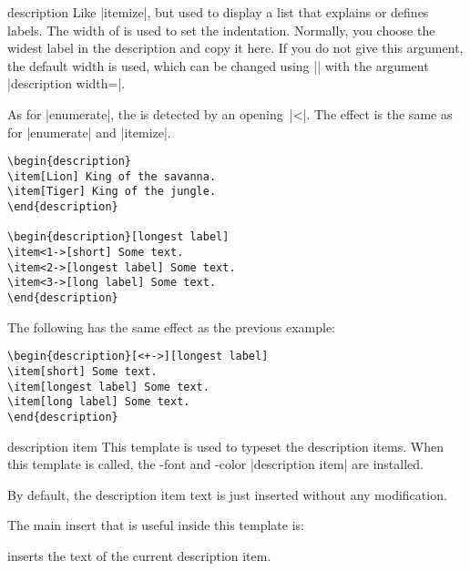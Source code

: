 \begin{environment}{{description}}
  Like |itemize|, but used to display a list that explains or defines labels. The width of  is used to set the indentation. Normally, you choose the widest label in the description and copy it here. If you do not give this argument, the default width is used, which can be changed using |\setbeamersize| with the argument |description width=|.

  As for |enumerate|, the  is detected by an opening~|<|. The effect is the same as for |enumerate| and |itemize|.
  \example
\begin{verbatim}
\begin{description}
\item[Lion] King of the savanna.
\item[Tiger] King of the jungle.
\end{description}

\begin{description}[longest label]
\item<1->[short] Some text.
\item<2->[longest label] Some text.
\item<3->[long label] Some text.
\end{description}
\end{verbatim}

  \example
  The following has the same effect as the previous example:
\begin{verbatim}
\begin{description}[<+->][longest label]
\item[short] Some text.
\item[longest label] Some text.
\item[long label] Some text.
\end{description}
\end{verbatim}

  \begin{element}{description item}\yes\yes\yes
    This template is used to typeset the description items. When this template is called, the \beamer-font and -color |description item| are installed.

    \begin{templateoptions}
      By default, the description item text is just inserted without any modification.
    \end{templateoptions}

    The main insert that is useful inside this template is:
    \begin{templateinserts}
      \iteminsert{\insertdescriptionitem} inserts the text of the current description item.
    \end{templateinserts}
  \end{element}
\end{environment}

